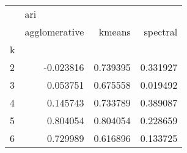 \begin{tabular}{lrrr}
\toprule
{} & \multicolumn{3}{l}{ari} \\
{} & agglomerative &    kmeans &  spectral \\
k &               &           &           \\
\midrule
2 &     -0.023816 &  0.739395 &  0.331927 \\
3 &      0.053751 &  0.675558 &  0.019492 \\
4 &      0.145743 &  0.733789 &  0.389087 \\
5 &      0.804054 &  0.804054 &  0.228659 \\
6 &      0.729989 &  0.616896 &  0.133725 \\
\bottomrule
\end{tabular}
